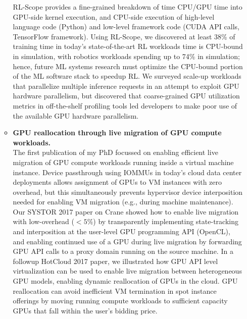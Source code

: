 \documentclass[letterpaper,11pt]{article}
\newcommand{\BulletZeroLeftMargin}{1.5em}
\newcommand{\resitem}[1]{\item #1 \vspace{-2pt}}
\begin{document}
\begin{itemize}[leftmargin=\BulletZeroLeftMargin]
\begin{itemize}[leftmargin=\BulletZeroLeftMargin]
{            RL-Scope provides a fine-grained breakdown of time CPU/GPU time into GPU-side kernel execution, and CPU-side execution of high-level language code (Python) and low-level framework code (CUDA API calls, TensorFlow framework).
            Using RL-Scope, we discovered at least 38\% of training time in today's state-of-the-art RL workloads time is CPU-bound in simulation, with robotics workloads spending up to 74\% in simulation; hence, future ML systems research must optimize the CPU-bound portion of the ML software stack to speedup RL.  
            We surveyed scale-up workloads that parallelize multiple inference requests in an attempt to exploit GPU hardware parallelism, but discovered that coarse-grained GPU utilization metrics in off-the-shelf profiling tools led developers to make poor use of the available GPU hardware parallelism.
        }
        \resitem{
            \textbf{GPU reallocation through live migration of GPU compute workloads.} \\
            The first publication of my PhD focussed on enabling efficient live migration of GPU compute workloads running inside a virtual machine instance.
            Device passthrough using IOMMUs in today's cloud data center deployments allows assignment of GPUs to VM instances with zero overhead, but this simultaneously prevents hypervisor device interposition needed for enabling VM migration (e.g., during machine maintenance).
            Our SYSTOR 2017 paper on Crane showed how to enable live migration with low-overhead ($< 5\%$) by transparently implementing state-tracking and interposition at the user-level GPU programming API (OpenCL), and enabling continued use of a GPU during live migration by forwarding GPU API calls to a proxy domain running on the source machine.
            In a followup HotCloud 2017 paper, we illustrated how GPU API level virtualization can be used to enable live migration between heterogeneous GPU models, enabling dynamic reallocation of GPUs in the cloud.
            GPU reallocation can avoid inefficient VM termination in spot instance offerings by moving running compute workloads to sufficient capacity GPUs that fall within the user's bidding price.
        }
    \end{itemize}

\clearpage


\end{itemize}
\end{document}
